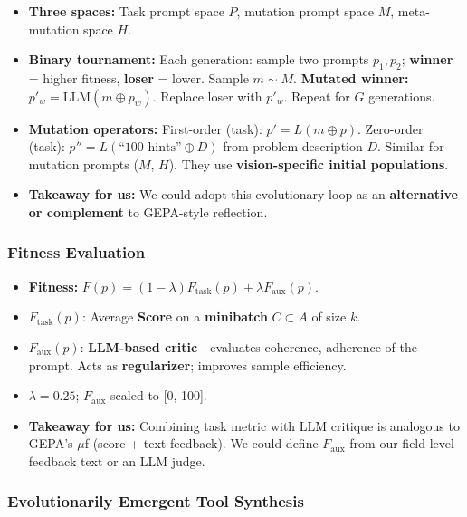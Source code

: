 \documentclass[11pt,a4paper]{article}
\begin{document}
\begin{itemize}
  \item \textbf{Three spaces:} Task prompt space $P$, mutation prompt space $M$, meta-mutation space $H$.
  \item \textbf{Binary tournament:} Each generation: sample two prompts $p_1, p_2$; \textbf{winner} = higher fitness, \textbf{loser} = lower. Sample $m \sim M$. \textbf{Mutated winner:} $p'_w = \mathrm{LLM}(m \oplus p_w)$. Replace loser with $p'_w$. Repeat for $G$ generations.
  \item \textbf{Mutation operators:} First-order (task): $p' = L(m \oplus p)$. Zero-order (task): $p'' = L(\textrm{``100 hints''} \oplus D)$ from problem description $D$. Similar for mutation prompts ($M$, $H$). They use \textbf{vision-specific initial populations}.
  \item \textbf{Takeaway for us:} We could adopt this evolutionary loop as an \textbf{alternative or complement} to GEPA-style reflection.
\end{itemize}

\subsubsection{Fitness Evaluation}

\begin{itemize}
  \item \textbf{Fitness:} $F(p) = (1 - \lambda) F_{\mathrm{task}}(p) + \lambda F_{\mathrm{aux}}(p)$.
  \item $F_{\mathrm{task}}(p)$: Average \textbf{Score} on a \textbf{minibatch} $C \subset A$ of size $k$.
  \item $F_{\mathrm{aux}}(p)$: \textbf{LLM-based critic}---evaluates coherence, adherence of the prompt. Acts as \textbf{regularizer}; improves sample efficiency.
  \item $\lambda = 0.25$; $F_{\mathrm{aux}}$ scaled to [0, 100].
  \item \textbf{Takeaway for us:} Combining task metric with LLM critique is analogous to GEPA's $\mu$f (score + text feedback). We could define $F_{\mathrm{aux}}$ from our field-level feedback text or an LLM judge.
\end{itemize}

\subsubsection{Evolutionarily Emergent Tool Synthesis}
\end{document}
